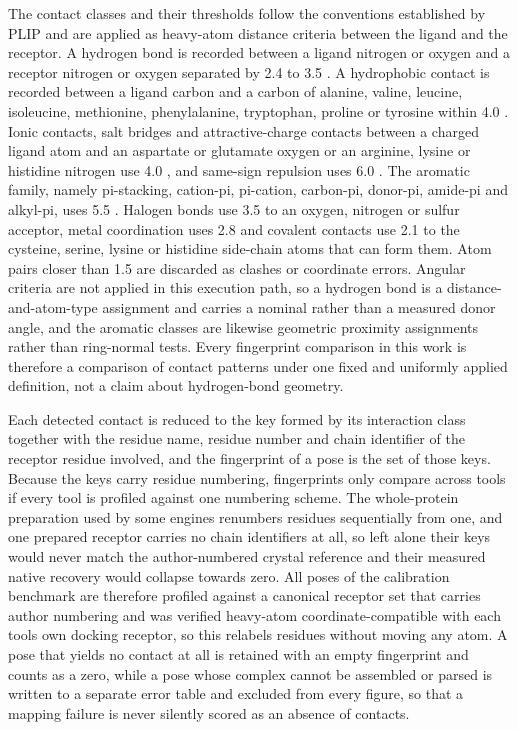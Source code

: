 The contact classes and their thresholds follow the conventions established by PLIP \cite{ref054} and are applied as heavy-atom distance criteria between the ligand and the receptor. A hydrogen bond is recorded between a ligand nitrogen or oxygen and a receptor nitrogen or oxygen separated by 2.4 to 3.5 \angstrom{}. A hydrophobic contact is recorded between a ligand carbon and a carbon of alanine, valine, leucine, isoleucine, methionine, phenylalanine, tryptophan, proline or tyrosine within 4.0 \angstrom{}. Ionic contacts, salt bridges and attractive-charge contacts between a charged ligand atom and an aspartate or glutamate oxygen or an arginine, lysine or histidine nitrogen use 4.0 \angstrom{}, and same-sign repulsion uses 6.0 \angstrom{}. The aromatic family, namely pi-stacking, cation-pi, pi-cation, carbon-pi, donor-pi, amide-pi and alkyl-pi, uses 5.5 \angstrom{}. Halogen bonds use 3.5 \angstrom{} to an oxygen, nitrogen or sulfur acceptor, metal coordination uses 2.8 \angstrom{} and covalent contacts use 2.1 \angstrom{} to the cysteine, serine, lysine or histidine side-chain atoms that can form them. Atom pairs closer than 1.5 \angstrom{} are discarded as clashes or coordinate errors. Angular criteria are not applied in this execution path, so a hydrogen bond is a distance-and-atom-type assignment and carries a nominal rather than a measured donor angle, and the aromatic classes are likewise geometric proximity assignments rather than ring-normal tests. Every fingerprint comparison in this work is therefore a comparison of contact patterns under one fixed and uniformly applied definition, not a claim about hydrogen-bond geometry.

Each detected contact is reduced to the key formed by its interaction class together with the residue name, residue number and chain identifier of the receptor residue involved, and the fingerprint of a pose is the set of those keys. Because the keys carry residue numbering, fingerprints only compare across tools if every tool is profiled against one numbering scheme. The whole-protein preparation used by some engines renumbers residues sequentially from one, and one prepared receptor carries no chain identifiers at all, so left alone their keys would never match the author-numbered crystal reference and their measured native recovery would collapse towards zero. All poses of the calibration benchmark are therefore profiled against a canonical receptor set that carries author numbering and was verified heavy-atom coordinate-compatible with each tool\textquotesingle s own docking receptor, so this relabels residues without moving any atom. A pose that yields no contact at all is retained with an empty fingerprint and counts as a zero, while a pose whose complex cannot be assembled or parsed is written to a separate error table and excluded from every figure, so that a mapping failure is never silently scored as an absence of contacts.

